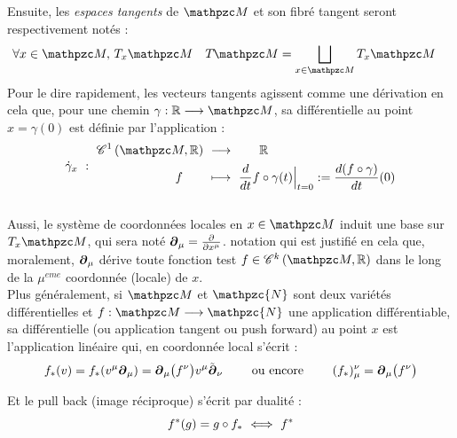 Ensuite, les \emph{espaces tangents} de $\manu$  et son fibré tangent seront respectivement notés :
\begin{align}
	\forall x\in\manu,\ &\tg[x]{\manu}  &  \tg{\manu} &= \bigsqcup_{x\in\manu}\tg[x]{\manu}
\end{align} 
Pour le dire rapidement, les vecteurs tangents agissent comme une dérivation en cela que, pour une chemin $\gamma : \R\lr\manu$, sa différentielle au point $x=\gamma(0)$ est définie par l'application :
\begin{equation} \label{eq:def2vec_tg}
	\dot{\gamma}_{x}\  :\ \begin{aligned}
		\conti[1]{\manu}{\R}\ &\lr\qquad \R \\ 
		f\qquad &\lmt\ \frac{d}{dt} f \circ\gamma(t)\Big|_{t=0} \defeq \frac{d(f \circ \gamma)}{dt}(0)
	\end{aligned}
\end{equation}
\\
Aussi, le système de coordonnées locales en $x\in\manu$ induit une base sur $\tg[x]{\manu}$, qui sera noté  $\boldsymbol{\partial}_\mu = \frac{\partial}{\partial x^\mu}$. notation qui est justifié en cela que, moralement, $\boldsymbol{\partial}_\mu$ dérive toute fonction test $f\in\conti[k]{\manu}{\R}$ dans le long de la $\mu^{eme}$ coordonnée (locale) de $x$.
\\

Plus généralement, si $\manu$ et $\mathpzc{N}$ sont deux variétés différentielles et $f : \manu\lr \mathpzc{N}$ une application différentiable, sa différentielle (ou application tangent ou push forward) au point $x$ est l'application linéaire qui, en coordonnée local s'écrit :
\[f_*(v) = f_*(v^\mu \boldsymbol{\partial}_\mu) = \boldsymbol{\partial}_\mu\big( f^\nu \big)v^\mu \Tilde{\boldsymbol{\partial}}_\nu\qquad \text{ ou encore }\qquad  (f_*)_\mu^\nu = \boldsymbol{\partial}_\mu\big( f^\nu \big)\]

Et le pull back (image réciproque) s'écrit par dualité :
\[f^*(g) = g\circ f_* \ \Longleftrightarrow\ f^*\]

